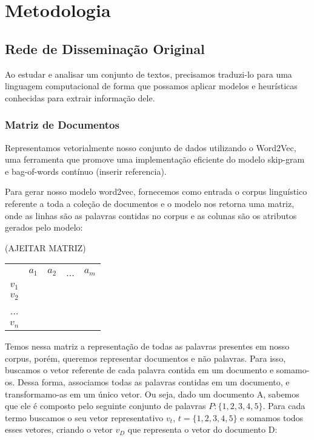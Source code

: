 \documentclass[a4paper,12pt]{article}
\begin{document}
\section{Metodologia}

\subsection{Rede de Disseminação Original}

Ao estudar e analisar um conjunto de textos, precisamos traduzi-lo para uma linguagem computacional de forma que possamos aplicar modelos e heurísticas 
conhecidas para extrair informação dele.


\subsubsection{Matriz de Documentos}

Representamos vetorialmente nosso conjunto de dados utilizando o Word2Vec, uma ferramenta que promove uma implementação eficiente do
modelo skip-gram e bag-of-words contínuo (inserir referencia).

Para gerar nosso modelo word2vec, fornecemos como entrada o corpus linguístico referente a toda a coleção de documentos
e o modelo nos retorna uma matriz, onde as linhas são as palavras contidas no corpus e as colunas são os atributos gerados pelo modelo:

(AJEITAR MATRIZ)
\begin{center}
 \begin{tabular}{ccccc}
          & $a_{1}$ & $a_{2}$ & ... & $a_{m}$ \\ \cline{2-5}
    $v_{1}$ &    &    &     &    \\
    $v_{2}$ &    &    &     &    \\
    ...  &    &    &     &    \\
    $v_{n}$ &    &    &     &    \\
    \end{tabular}
 
\end{center}


Temos nessa matriz a representação de todas as palavras presentes em nosso corpus, porém, queremos representar documentos e não palavras.
Para isso, buscamos o vetor referente de cada palavra contida em um documento e somamo-os. Dessa forma, associamos todas as palavras contidas
em um documento, e transformamo-as em um único vetor. Ou seja, dado um documento A, sabemos que ele é composto pelo seguinte conjunto de palavras
$P:\{1,2,3,4,5\}$. Para cada termo buscamos o seu vetor representativo $v_{t}$, $t =\{1,2,3,4,5\}$ e somamos todos esses vetores, criando o vetor
$v_{D}$ que representa o vetor do documento D:
\end{document}
